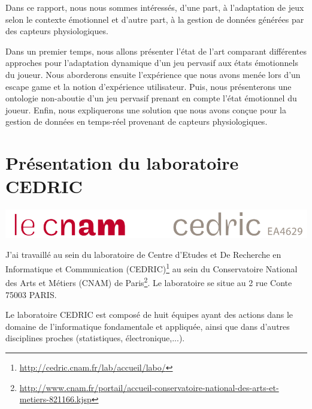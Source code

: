 \documentclass{article}
\begin{document}
	Dans ce rapport, nous nous sommes intéressés, d'une part, à l'adaptation de jeux selon le contexte émotionnel et d'autre part, à la gestion de données générées par des capteurs physiologiques.\par
	Dans un premier temps, nous allons présenter l'état de l'art comparant différentes approches pour l'adaptation dynamique d'un jeu pervasif aux états émotionnels du joueur. 
	Nous aborderons ensuite l'expérience que nous avons menée lors d'un escape game et la notion d'expérience utilisateur.
	Puis, nous présenterons une ontologie non-aboutie d'un jeu pervasif prenant en compte l'état émotionnel du joueur.
	Enfin, nous expliquerons une solution que nous avons conçue pour la gestion de données en temps-réel provenant de capteurs physiologiques.

\section{Présentation du laboratoire CEDRIC}
	\begin{center}
		\includegraphics[scale=0.35]{../include/logo-cedric.PNG}\\
	\end{center}
	J'ai travaillé au sein du laboratoire de Centre d'Etudes et De Recherche en Informatique et Communication (CEDRIC)\footnote{\href{http://cedric.cnam.fr/lab/accueil/labo/}{http://cedric.cnam.fr/lab/accueil/labo/}} au sein du Conservatoire National des Arts et Métiers (CNAM) de Paris\footnote{\href{http://www.cnam.fr/portail/accueil-conservatoire-national-des-arts-et-metiers-821166.kjsp}{http://www.cnam.fr/portail/accueil-conservatoire-national-des-arts-et-metiers-821166.kjsp}}. 
	Le laboratoire se situe au 2 rue Conte 75003 PARIS.\par
	Le laboratoire CEDRIC est composé de huit équipes ayant des actions dans le domaine de l'informatique fondamentale et appliquée, ainsi que dans d'autres disciplines proches (statistiques, électronique,...).
\end{document}
